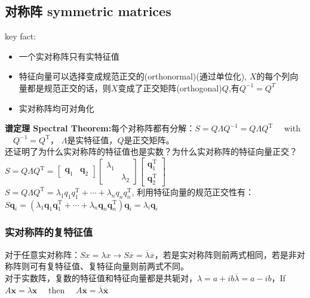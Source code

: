 \documentclass[UTF8]{article}
\begin{document}
    \subsection{对称阵 symmetric matrices}
    key fact:
    \begin{itemize}
        \item 一个实对称阵只有实特征值
        \item 特征向量可以选择变成规范正交的(orthonormal)(通过单位化), $X$的每个列向量都是规范正交的话，则$X$变成了正交矩阵(orthogonal)$Q$,有$Q^{-1}=Q^{T}$
        \item 实对称阵均可对角化
    \end{itemize}
    \textbf{谱定理 Spectral Theorem:}每个对称阵都有分解：$S=Q \Lambda Q^{-1}=Q \Lambda Q^{\mathrm{T}} \quad$ with $\quad Q^{-1}=Q^{\mathrm{T}}$， $\Lambda$是实特征值，$Q$是正交矩阵。
    \\
    还证明了为什么实对称阵的特征值也是实数？为什么实对称阵的特征向量正交？\\
    $S=Q \Lambda Q^{\mathrm{T}}=\left[\begin{array}{ll}{\boldsymbol{q}_{1}} & {\boldsymbol{q}_{2}}\end{array}\right]\left[\begin{array}{ll}{\lambda_{1}} & {} \\ {} & {\lambda_{2}}\end{array}\right]\left[\begin{array}{l}{\boldsymbol{q}_{1}^{\mathrm{T}}} \\ {\boldsymbol{q}_{2}^{\mathrm{T}}}\end{array}\right]$\\
    $S=Q \Lambda Q^{\mathrm{T}}=\lambda_{1} q_{1} q_{1}^{\mathrm{T}}+\cdots+\lambda_{n} q_{n} q_{n}^{\mathrm{T}}$, 利用特征向量的规范正交性有：$S \boldsymbol{q}_{i}=\left(\lambda_{1} \boldsymbol{q}_{1} \boldsymbol{q}_{1}^{\mathrm{T}}+\cdots+\lambda_{n} \boldsymbol{q}_{n} \boldsymbol{q}_{n}^{\mathrm{T}}\right) \boldsymbol{q}_{i}=\lambda_{i} \boldsymbol{q}_{i}$

    \subsubsection{实对称阵的复特征值}
    对于任意实对称阵：$S x=\lambda x \rightarrow S \overline{x}=\overline{\lambda} \overline{x}$，若是实对称阵则前两式相同，若是非对称阵则可有复特征值、复特征向量则前两式不同。
    \\
    对于实数阵，复数的特征值和特征向量都是共轭对，$\lambda=a+i b$\quad $\overline{\lambda}=a-i b$，If $A \boldsymbol{x}=\lambda \boldsymbol{x} \quad$ then $\quad A \overline{\boldsymbol{x}}=\overline{\lambda} \overline{\boldsymbol{x}}$
\end{document}
